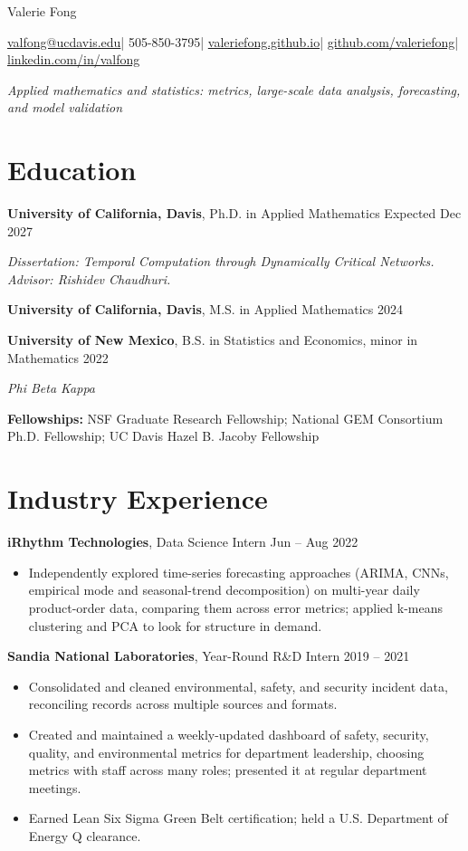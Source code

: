 \documentclass[10pt,letterpaper]{article}
\newcommand{\entry}[2]{%
  \noindent#1\hfill
  {\fontsize{9.8}{12}\selectfont\color{muted}#2}\par
}
\newcommand{\sub}[1]{{\itshape\color{muted}#1\par}}
\newcommand{\gap}{\vspace{4pt}}
\newcommand{\cbar}{{\color{sep}\enspace|\enspace}}
\begin{document}
\begin{center}
{\fontsize{21}{24}\selectfont Valerie Fong}\par\vspace{2pt}
{\fontsize{9.8}{12}\selectfont\color{muted}%
\href{mailto:valfong@ucdavis.edu}{valfong@ucdavis.edu}\cbar
505-850-3795\cbar
\href{https://valeriefong.github.io}{valeriefong.github.io}\cbar
\href{https://github.com/valeriefong}{github.com/valeriefong}\cbar
\href{https://linkedin.com/in/valfong}{linkedin.com/in/valfong}}\par\vspace{3pt}
{\itshape Applied mathematics and statistics: metrics, large-scale data analysis, forecasting, and model validation}
\end{center}
\vspace{-8pt}

\section*{Education}

\entry{\textbf{University of California, Davis}, Ph.D. in Applied Mathematics}
{Expected Dec 2027}
\sub{Dissertation: Temporal Computation through Dynamically Critical Networks. Advisor: Rishidev Chaudhuri.}

\gap
\entry{\textbf{University of California, Davis}, M.S. in Applied Mathematics}
{2024}

\gap
\entry{\textbf{University of New Mexico}, B.S. in Statistics and Economics, minor in Mathematics}
{2022}
\sub{Phi Beta Kappa}
\gap
\textbf{Fellowships:} NSF Graduate Research Fellowship; National GEM Consortium Ph.D. Fellowship; UC Davis Hazel B. Jacoby Fellowship

\section*{Industry Experience}

\entry{\textbf{iRhythm Technologies}, Data Science Intern}
{Jun -- Aug 2022}
\begin{itemize}
  \item Independently explored time-series forecasting approaches (ARIMA, CNNs, empirical mode and seasonal-trend decomposition) on multi-year daily product-order data, comparing them across error metrics; applied k-means clustering and PCA to look for structure in demand.
\end{itemize}

\gap
\entry{\textbf{Sandia National Laboratories}, Year-Round R\&D Intern}
{2019 -- 2021}
\begin{itemize}
  \item Consolidated and cleaned environmental, safety, and security incident data, reconciling records across multiple sources and formats.
  \item Created and maintained a weekly-updated dashboard of safety, security, quality, and environmental metrics for department leadership, choosing metrics with staff across many roles; presented it at regular department meetings.
  \item Earned Lean Six Sigma Green Belt certification; held a U.S. Department of Energy Q clearance.
\end{itemize}
\end{document}
